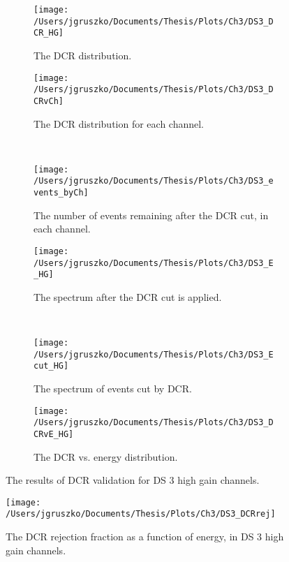 \begin{figure*}[]
 \centering
 \begin{subfigure}[t]{0.45\textwidth}
   \texttt{[image: /Users/jgruszko/Documents/Thesis/Plots/Ch3/DS3\_DCR\_HG]}
    \caption{The DCR distribution.}
    \label{fig:DS3_DCR}
  \end{subfigure}
\hfill
 \begin{subfigure}[t]{0.45\textwidth}
   \texttt{[image: /Users/jgruszko/Documents/Thesis/Plots/Ch3/DS3\_DCRvCh]}
    \caption{The DCR distribution for each channel.}
    \label{fig:DS3_DCRvCh}
  \end{subfigure}
   ~
 \begin{subfigure}[t]{0.45\textwidth}
   \texttt{[image: /Users/jgruszko/Documents/Thesis/Plots/Ch3/DS3\_events\_byCh]}
    \caption{The number of events remaining after the DCR cut, in each channel.}
    \label{fig:events_byCh}
  \end{subfigure}
\hfill
  \begin{subfigure}[t]{0.45\textwidth}
   \texttt{[image: /Users/jgruszko/Documents/Thesis/Plots/Ch3/DS3\_E\_HG]}
    \caption{The spectrum after the DCR cut is applied.}
    \label{fig:DS3_E_HG}
  \end{subfigure}
   ~
  \begin{subfigure}[t]{0.45\textwidth}
   \texttt{[image: /Users/jgruszko/Documents/Thesis/Plots/Ch3/DS3\_Ecut\_HG]}
    \caption{The spectrum of events cut by DCR.}
    \label{fig:DS3_Ecut_HG}
  \end{subfigure}
\hfill
     \begin{subfigure}[t]{0.45\textwidth}
   \texttt{[image: /Users/jgruszko/Documents/Thesis/Plots/Ch3/DS3\_DCRvE\_HG]}
    \caption{The DCR vs. energy distribution.}
    \label{fig:DS3_DCRvE_HG}
  \end{subfigure}
  \caption{The results of DCR validation for DS 3 high gain channels.}
  \end{figure*}
  
 \begin{figure}[t]
   \centering
   \texttt{[image: /Users/jgruszko/Documents/Thesis/Plots/Ch3/DS3\_DCRrej]}
    \caption{The DCR rejection fraction as a function of energy, in DS 3 high gain channels.}
    \label{fig:DS3_DCRrej}
  \end{figure}


